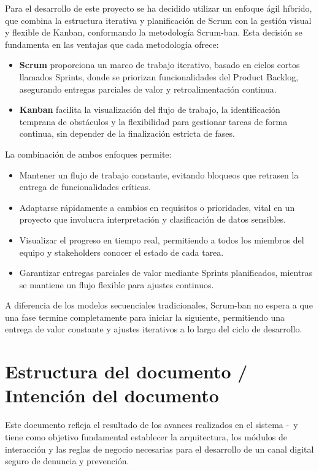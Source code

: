     Para el desarrollo de este proyecto se ha decidido utilizar un enfoque ágil híbrido, que combina la estructura iterativa y planificación de Scrum con la gestión visual y flexible de Kanban, conformando la metodología Scrum-ban. Esta decisión se fundamenta en las ventajas que cada metodología ofrece:
    \begin{itemize}
        \item \textbf{Scrum} proporciona un marco de trabajo iterativo, basado en ciclos cortos llamados Sprints, donde se priorizan funcionalidades del Product Backlog, asegurando entregas parciales de valor y retroalimentación continua.
        \item \textbf{Kanban} facilita la visualización del flujo de trabajo, la identificación temprana de obstáculos y la flexibilidad para gestionar tareas de forma continua, sin depender de la finalización estricta de fases.
    \end{itemize}
    La combinación de ambos enfoques permite:
    \begin{itemize}
        \item Mantener un flujo de trabajo constante, evitando bloqueos que retrasen la entrega de funcionalidades críticas.
        \item Adaptarse rápidamente a cambios en requisitos o prioridades, vital en un proyecto que involucra interpretación y clasificación de datos sensibles.
        \item Visualizar el progreso en tiempo real, permitiendo a todos los miembros del equipo y stakeholders conocer el estado de cada tarea.
        \item Garantizar entregas parciales de valor mediante Sprints planificados, mientras se mantiene un flujo flexible para ajustes continuos.
    \end{itemize}
    A diferencia de los modelos secuenciales tradicionales, Scrum-ban no espera a que una fase termine completamente para iniciar la siguiente, permitiendo una entrega de valor constante y ajustes iterativos a lo largo del ciclo de desarrollo.

\section{Estructura del documento / Intención del documento}

    Este documento refleja el resultado de los avances realizados en el sistema \varCveSistema-\varSistema\ y tiene como objetivo fundamental establecer la arquitectura, los módulos de interacción y las reglas de negocio necesarias para el desarrollo de un canal digital seguro de denuncia y prevención.

